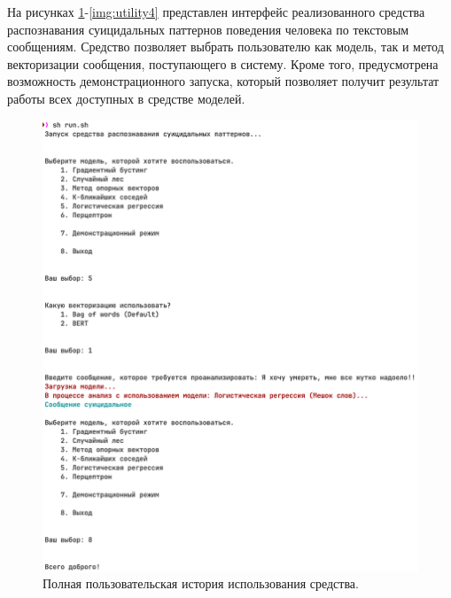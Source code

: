 На рисунках \ref{img:utility1}-\ref{img:utility4} представлен интерфейс реализованного средства распознавания суицидальных паттернов поведения человека по текстовым сообщениям. 
Средство позволяет выбрать пользователю как модель, так и метод векторизации сообщения, поступающего в систему.
Кроме того, предусмотрена возможность демонстрационного запуска, который позволяет получит результат работы всех доступных в средстве моделей.

\begin{figure}[H]
	\centering
	\includegraphics[width=\textwidth]{inc/utility1.png}
	\caption{ Полная пользовательская история использования средства. }
	\label{img:utility1}
\end{figure}

